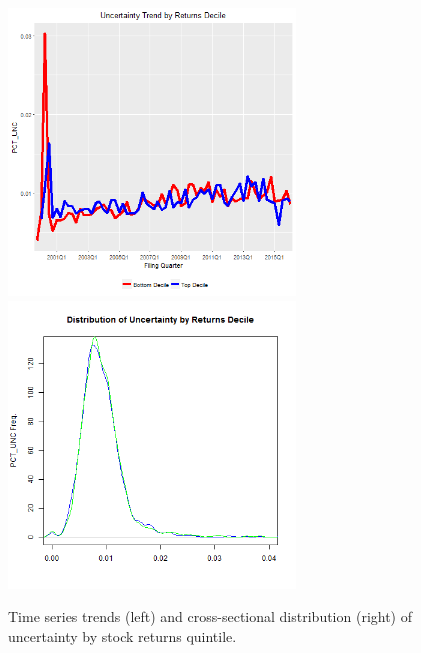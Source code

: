 \begin{figure}[H] 
\centering
\includegraphics[width=3in, height=3in]{figures/punc-by-bhr-ts}
\includegraphics[width=3in, height=3in]{figures/punc-by-bhr-xs}
\captionsetup{justification=centering, width=.95\textwidth} 
\caption{\footnotesize Time series trends (left) and cross-sectional distribution (right) of uncertainty by stock returns quintile.} \label{bunc-bhr}
\end{figure} 
\newpage
